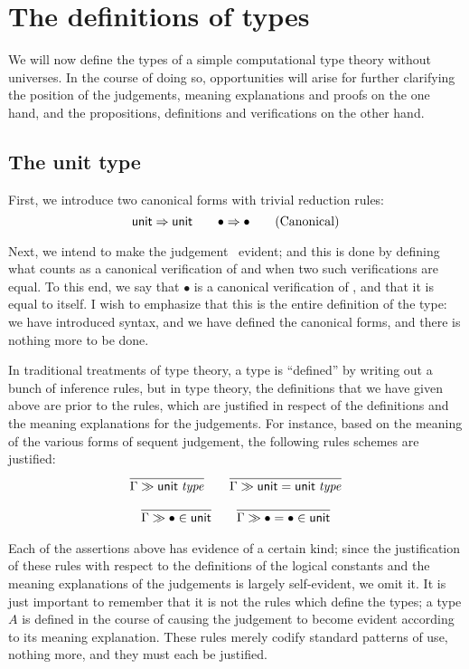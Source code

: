 \documentclass[main.tex]{subfiles}
\begin{document}
\section{The definitions of types}

We will now define the types of a simple computational type theory without
universes. In the course of doing so, opportunities will arise for further
clarifying the position of the judgements, meaning explanations and proofs on
the one hand, and the propositions, definitions and verifications on the other
hand.

\subsection{The unit type}

First, we introduce two canonical forms with trivial reduction rules:
\begin{equation}
  \mathsf{unit}\Rightarrow\mathsf{unit}\qquad
  \bullet\Rightarrow\bullet
  \tag{Canonical}
\end{equation}

Next, we intend to make the judgement \isset\tyunit\ evident; and this is done by
defining what counts as a canonical verification of \tyunit and when two such
verifications are equal. To this end, we say that $\bullet$ is a canonical
verification of \tyunit, and that it is equal to itself.  I wish to emphasize
that this is the entire definition of the type: we have introduced syntax, and
we have defined the canonical forms, and there is nothing more to be done.

In traditional treatments of type theory, a type is ``defined'' by writing out
a bunch of inference rules, but in type theory, the definitions that we have
given above are prior to the rules, which are justified in respect of the
definitions and the meaning explanations for the judgements. For instance,
based on the meaning of the various forms of sequent judgement, the following
rules schemes are justified:
\begin{gather*}
  \infer{
    \sequent\Gamma\isset\tyunit
  }{
  }\qquad
  \infer{
    \sequent\Gamma\isset{\tyunit=\tyunit}
  }{
  }\\[6pt]
  \infer{
    \sequent\Gamma\ver\bullet\tyunit
  }{
  }\qquad
  \infer{
    \sequent\Gamma\ver{\bullet=\bullet}{\tyunit}
  }{
  }
\end{gather*}

Each of the assertions above has evidence of a certain kind; since the
justification of these rules with respect to the definitions of the logical
constants and the meaning explanations of the judgements is largely
self-evident, we omit it. It is just important to remember that it is not the
rules which define the types; a type $A$ is defined in the course of causing
the judgement  to become evident according to its meaning explanation.
These rules merely codify standard patterns of use, nothing more, and they must
each be justified.
\end{document}
